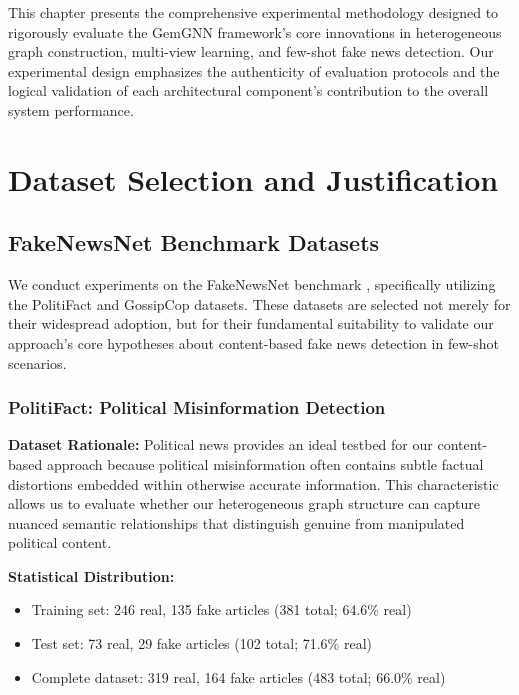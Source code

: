 
This chapter presents the comprehensive experimental methodology designed to rigorously evaluate the GemGNN framework's core innovations in heterogeneous graph construction, multi-view learning, and few-shot fake news detection. Our experimental design emphasizes the authenticity of evaluation protocols and the logical validation of each architectural component's contribution to the overall system performance.

\section{Dataset Selection and Justification}

\subsection{FakeNewsNet Benchmark Datasets}

We conduct experiments on the FakeNewsNet benchmark \cite{shu2018fakenewsnet}, specifically utilizing the PolitiFact and GossipCop datasets. These datasets are selected not merely for their widespread adoption, but for their fundamental suitability to validate our approach's core hypotheses about content-based fake news detection in few-shot scenarios.

\subsubsection{PolitiFact: Political Misinformation Detection}

\textbf{Dataset Rationale:} Political news provides an ideal testbed for our content-based approach because political misinformation often contains subtle factual distortions embedded within otherwise accurate information. This characteristic allows us to evaluate whether our heterogeneous graph structure can capture nuanced semantic relationships that distinguish genuine from manipulated political content.

\textbf{Statistical Distribution:} 
\begin{itemize}
\item Training set: 246 real, 135 fake articles (381 total; 64.6\% real)
\item Test set: 73 real, 29 fake articles (102 total; 71.6\% real)  
\item Complete dataset: 319 real, 164 fake articles (483 total; 66.0\% real)
\end{itemize}

